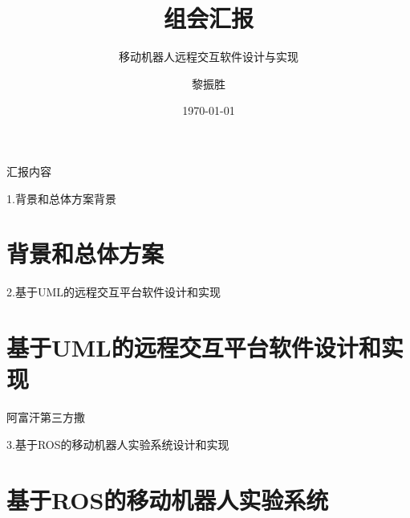 \documentclass{beamer}
\title{组会汇报}
\subtitle{移动机器人远程交互软件设计与实现}
\institute{中南大学机电工程学院}
\author{黎振胜}
\date{\today}
\begin{document}
\begin{frame}
\maketitle
\end{frame}
\begin{frame}[t]{汇报内容}
 \tableofcontents[pausesections]
\end{frame}
\begin{frame}[t]{1.背景和总体方案}{背景}
    \section{背景和总体方案}
    \begin{env}
    \end{env}
    
\end{frame}
\begin{frame}[t]{2.基于UML的远程交互平台软件设计和实现}
    \section{基于UML的远程交互平台软件设计和实现}
    阿富汗第三方撒
\end{frame}
\begin{frame}[t]{3.基于ROS的移动机器人实验系统设计和实现}
    \section{基于ROS的移动机器人实验系统}
\end{frame}
\end{document}
